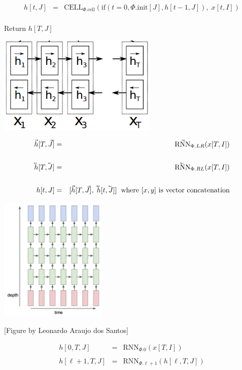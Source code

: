 {\vfill
\begin{eqnarray*}
h[t,J] & = & \mathrm{CELL}_{\Phi.\mathrm{cell}}(\mathrm{if}(t=0,\Phi.\mathrm{init}[J],h[t-1,J]),\;x[t,I]) \\
\end{eqnarray*}

\vfill
Return $h[T,J]$




\centerline{\includegraphics[width = 3in]{../images/biRNN}}

\begin{eqnarray*}
\vec{h}[T,\vec{J}] & = & \vec{\mathrm{RNN}}_{\Phi.LR}(x[T,I]) \\
\\
\cev{h}[T,\cev{J}] & = & \cev{\mathrm{RNN}}_{\Phi.RL}(x[T,I]) \\
\\
h[t,J] & = & [\vec{h}[T,\vec{J}],\;\cev{h}[t,\cev{J}]]\;\;\mbox{where $[x,y]$ is vector concatenation}
\end{eqnarray*}



\centerline{\includegraphics[width = 2in]{../images/RNNstack}}
\centerline{\large [Figure by Leonardo Araujo dos Santos]}

\begin{eqnarray*}
h[0,T,J] & = & \mathrm{RNN}_{\Phi.0}(x[T,I]) \\
\\
h[\ell+1,T,J] & = & \mathrm{RNN}_{\Phi.\ell+1}(h[\ell,T,J])
\end{eqnarray*}

}
